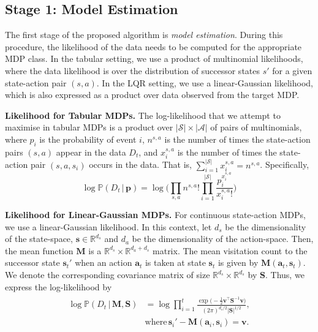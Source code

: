 \subsection{Stage 1: Model Estimation}
The first stage of the proposed algorithm is \emph{model estimation}. During this procedure, the likelihood of the data needs to be computed for the appropriate MDP class. In the tabular setting, we use a product of multinomial likelihoods, where the data likelihood is over the distribution of successor states $s'$ for a given state-action pair $(s, a)$. In the LQR setting, we use a linear-Gaussian likelihood, which is also expressed as a product over data observed from the target MDP. 

\noindent\textbf{Likelihood for Tabular MDPs.}
The log-likelihood that we attempt to maximise in tabular MDPs is a product over $|\mathcal{S}|\times|\mathcal{A}|$ of pairs of multinomials, where $p_i$ is the probability of event $i$, $n^{s,a}$ is the number of times the state-action pairs $(s, a)$ appear in the data $D_t$, and $x_i^{s,a}$ is the number of times the state-action pair $(s, a, s_i)$ occurs in the data. That is, $\sum_{i=1}^{|\mathcal{S}|} x_i^{s,a} = n^{s,a}$. Specifically,
\begin{equation}
    \log \mathbb{P}(D_t \, | \, \bm{p}) = \log \Bigg(\prod_{s, a} n^{s,a}!\prod_{i=1}^{|\mathcal{S}|}\frac{p_i^{x^{s,a}_i}}{x^{s,a}_i!} \Bigg)
\end{equation}

\noindent\textbf{Likelihood for Linear-Gaussian MDPs.}
For continuous state-action MDPs, we use a linear-Gaussian likelihood. In this context, let $d_s$ be the dimensionality of the state-space, $\bm{s} \in \mathbb{R}^{d_s}$ and $d_a$ be the dimensionality of the action-space. Then, the mean function $\mathbf{M}$ is a $\mathbb{R}^{d_s}\times\mathbb{R}^{d_a+d_s}$ matrix. The mean visitation count to the successor state $\bm{s}_t'$ when an action $\bm{a}_t$ is taken at state $\bm{s}_t$ is given by $\mathbf{M}(\bm{a}_t, \bm{s}_t)$. We denote the corresponding covariance matrix of size $\mathbb{R}^{d_s}\times\mathbb{R}^{d_s}$ by $\mathbf{S}$. Thus, we express the log-likelihood by
\begin{align*}
\begin{aligned}
    \log \mathbb{P}(D_t \, | \, \mathbf{M}, \mathbf{S}) &= \log \prod_{i=1}^t \frac{\exp\Big(-\frac{1}{2}\bm{v}^\top\mathbf{S}^{-1}\bm{v}\Big)}{(2\pi)^{d_s/2}|\mathbf{S}|^{1/2}},\\
    &\textrm{where} \, \bm{s}_i'-\mathbf{M}(\bm{a}_i, \bm{s}_i) = \bm{v}.
\end{aligned}
\end{align*}

